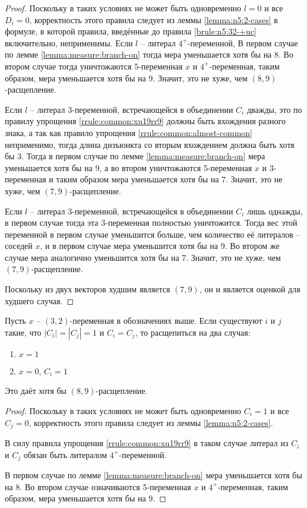 \begin{proof}
 Поскольку в таких условиях не может быть одновременно $l = 0$ и все $D_i = 0$, корректность этого правила следует из леммы \ref{lemma:n5:2-cases} в формуле, в которой правила, введённые до правила \ref{brule:n5:32-+uc} включительно, неприменимы.
 Если $l$ -- литерал $4^+$-переменной, В первом случае по лемме \ref{lemma:measure:branch-on} тогда мера уменьшается хотя бы на 8. Во втором случае тогда уничтожаются 5-переменная $x$ и $4^+$-переменная, таким образом, мера уменьшается хотя бы на 9. Значит, это не хуже, чем $(8,9)$-расщепление.

 Если $l$ -- литерал 3-переменной, встречающейся в объединении $C_i$ дважды, это по правилу упрощения \ref{rrule:common:xu19rr9} должны быть вхождения разного знака, а так как правило упрощения \ref{rrule:common:almost-common} неприменимо, тогда длина дизъюнкта со вторым вхождением должна быть хотя бы 3. Тогда в первом случае по лемме \ref{lemma:measure:branch-on} мера уменьшается хотя бы на 9, а во втором уничтожаются 5-переменная $x$ и 3-переменная и таким образом мера уменьшается хотя бы на 7. Значит, это не хуже, чем $(7,9)$-расщепление.

 Если $l$ -- литерал 3-переменной, встречающейся в объединении $C_i$ лишь однажды, в первом случае тогда эта 3-переменная полностью уничтожится. Тогда вес этой переменной в первом случае уменьшится больше, чем количество её литералов -- соседей $x$, и в первом случае мера уменьшится хотя бы на 9. Во втором же случае мера аналогично уменьшится хотя бы на 7. Значит, это не хуже, чем $(7,9)$-расщепление.

 Поскольку из двух векторов худшим является $(7,9)$, он и является оценкой для худшего случая.
\end{proof}

\begin{brule}
 Пусть $x$ -- $(3,2)$-переменная в обозначениях выше. Если существуют $i$ и $j$ такие, что $|C_i| = |C_j| = 1$ и $C_i = C_j$, то расщепиться на два случая:

 \begin{enumerate}
  \item $x = 1$
  \item $x = 0$, $C_i = 1$
 \end{enumerate}

 Это даёт хотя бы $(8,9)$-расщепление.
 \label{brule:n5:32-rest:same-c}
\end{brule}

\begin{proof}
 Поскольку в таких условиях не может быть одновременно $C_i = 1$ и все $C_j = 0$, корректность этого правила следует из леммы \ref{lemma:n5:2-cases}.

 В силу правила упрощения \ref{rrule:common:xu19rr9} в таком случае литерал из $C_i$ и $C_j$ обязан быть литералом $4^+$-переменной.

 В первом случае по лемме \ref{lemma:measure:branch-on} мера уменьшается хотя бы на 8. Во втором случае означиваются 5-переменная $x$ и $4^+$-переменная, таким образом, мера уменьшается хотя бы на 9.
\end{proof}

